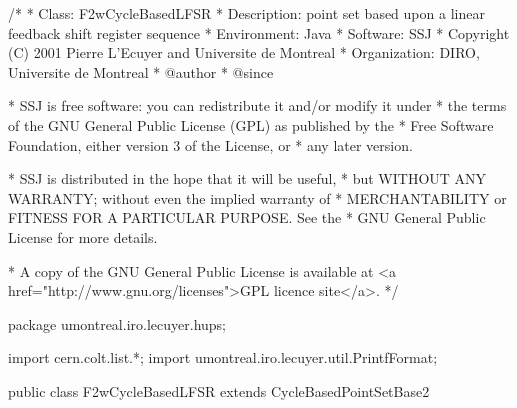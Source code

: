 \begin{code}
\begin{hide}
/*
 * Class:        F2wCycleBasedLFSR
 * Description:  point set based upon a linear feedback shift register
                 sequence
 * Environment:  Java
 * Software:     SSJ 
 * Copyright (C) 2001  Pierre L'Ecuyer and Universite de Montreal
 * Organization: DIRO, Universite de Montreal
 * @author       
 * @since

 * SSJ is free software: you can redistribute it and/or modify it under
 * the terms of the GNU General Public License (GPL) as published by the
 * Free Software Foundation, either version 3 of the License, or
 * any later version.

 * SSJ is distributed in the hope that it will be useful,
 * but WITHOUT ANY WARRANTY; without even the implied warranty of
 * MERCHANTABILITY or FITNESS FOR A PARTICULAR PURPOSE.  See the
 * GNU General Public License for more details.

 * A copy of the GNU General Public License is available at
   <a href="http://www.gnu.org/licenses">GPL licence site</a>.
 */
\end{hide}
package umontreal.iro.lecuyer.hups; \begin{hide}
import cern.colt.list.*;
import umontreal.iro.lecuyer.util.PrintfFormat;
\end{hide}


public class F2wCycleBasedLFSR extends CycleBasedPointSetBase2 \begin{hide} {

   private F2wStructure param;
\end{hide}\end{code}



